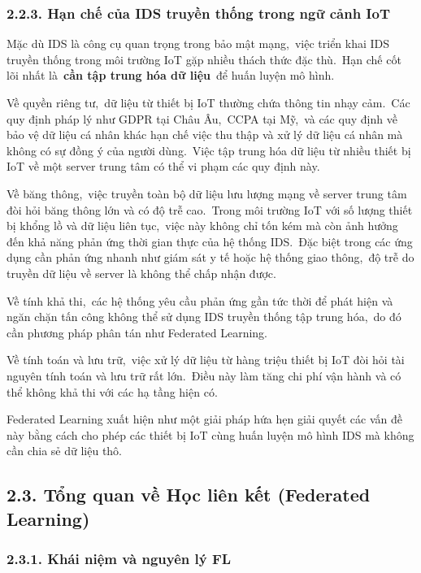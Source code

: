 \subsubsection{2.2.3. Hạn chế của IDS truyền thống trong ngữ cảnh IoT}\label{hux1ea1n-chux1ebf-cux1ee7a-ids-truyux1ec1n-thux1ed1ng-trong-ngux1eef-cux1ea3nh-iot}

Mặc dù IDS là công cụ quan trọng trong bảo mật mạng,~việc triển khai IDS truyền thống trong môi trường IoT gặp nhiều thách thức đặc thù.~Hạn chế cốt lõi nhất là~\textbf{cần tập trung hóa dữ liệu}~để huấn luyện mô hình.

Về quyền riêng tư,~dữ liệu từ thiết bị IoT thường chứa thông tin nhạy cảm.~Các quy định pháp lý như GDPR tại Châu Âu,~CCPA tại Mỹ,~và các quy định về bảo vệ dữ liệu cá nhân khác hạn chế việc thu thập và xử lý dữ liệu cá nhân mà không có sự đồng ý của người dùng.~Việc tập trung hóa dữ liệu từ nhiều thiết bị IoT về một server trung tâm có thể vi phạm các quy định này.

Về băng thông,~việc truyền toàn bộ dữ liệu lưu lượng mạng về server trung tâm đòi hỏi băng thông lớn và có độ trễ cao.~Trong môi trường IoT với số lượng thiết bị khổng lồ và dữ liệu liên tục,~việc này không chỉ tốn kém mà còn ảnh hưởng đến khả năng phản ứng thời gian thực của hệ thống IDS.~Đặc biệt trong các ứng dụng cần phản ứng nhanh như giám sát y tế hoặc hệ thống giao thông,~độ trễ do truyền dữ liệu về server là không thể chấp nhận được.

Về tính khả thi,~các hệ thống yêu cầu phản ứng gần tức thời để phát hiện và ngăn chặn tấn công không thể sử dụng IDS truyền thống tập trung hóa,~do đó cần phương pháp phân tán như Federated Learning.

Về tính toán và lưu trữ,~việc xử lý dữ liệu từ hàng triệu thiết bị IoT đòi hỏi tài nguyên tính toán và lưu trữ rất lớn.~Điều này làm tăng chi phí vận hành và có thể không khả thi với các hạ tầng hiện có.

Federated Learning xuất hiện như một giải pháp hứa hẹn giải quyết các vấn đề này bằng cách cho phép các thiết bị IoT cùng huấn luyện mô hình IDS mà không cần chia sẻ dữ liệu thô.

\subsection{2.3. Tổng quan về Học liên kết (Federated Learning)}\label{tux1ed5ng-quan-vux1ec1-hux1ecdc-liuxean-kux1ebft-federated-learning}

\subsubsection{2.3.1. Khái niệm và nguyên lý FL}\label{khuxe1i-niux1ec7m-vuxe0-nguyuxean-luxfd-fl}

